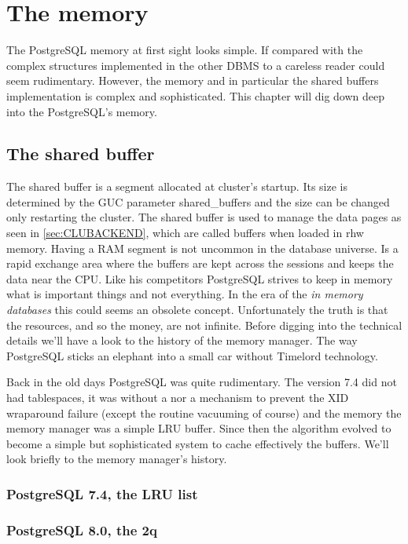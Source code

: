 \chapter{The memory}
\label{ch:PGMEMORY}
The PostgreSQL memory at first sight looks simple. If compared with the complex structures implemented in 
the other DBMS to a careless reader could seem rudimentary. However, the memory and in particular the 
shared buffers implementation is complex and sophisticated. This chapter will dig down deep into the 
PostgreSQL's memory.

\section{The shared buffer}
The shared buffer is a segment allocated at cluster's startup. Its size is determined by the GUC parameter 
shared\_buffers and the size can be changed only restarting the cluster. The shared buffer is used 
to manage the data pages as seen in \ref{sec:CLUBACKEND}, which are called buffers when loaded in 
rhw memory. Having a RAM segment is not uncommon in the database universe. Is a rapid exchange 
area where the buffers are kept across the sessions and keeps the data near the CPU. Like his competitors 
PostgreSQL strives to keep in memory what is important things and not everything. In the era of the 
\textit{in memory databases} this could seems an obsolete concept. Unfortunately the truth is that the 
resources, and so the money, are not infinite. Before digging into the technical details we'll have a look 
to the history of the memory manager. The way PostgreSQL sticks an elephant into a small car without 
Timelord technology.

Back in the old days PostgreSQL was quite rudimentary. The version 7.4 did not had tablespaces, it was 
without a  nor a mechanism to prevent the XID wraparound failure (except the routine vacuuming of course) 
and the memory the memory manager was a simple LRU buffer. Since then the algorithm evolved to become a 
simple but sophisticated system to cache effectively the buffers. We'll look briefly to the memory 
manager's history. 

\subsection{PostgreSQL 7.4, the LRU list}
\subsection{PostgreSQL 8.0, the 2q}
